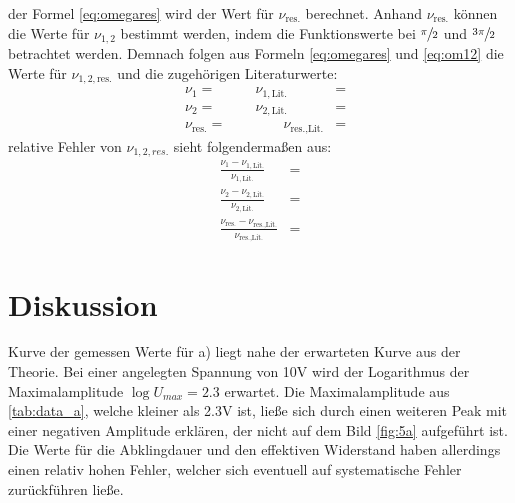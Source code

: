  \justifying der Formel \eqref{eq:omegares} wird der Wert für $\nu_{\text{res.}}$ berechnet. Anhand $\nu_{\text{res.}}$
  können die Werte für $\nu_{1,2}$ bestimmt werden, indem die Funktionswerte bei $\sfrac{\pi}{2}$ und 
  $\sfrac{3\pi}{2}$ betrachtet werden. Demnach folgen aus Formeln \eqref{eq:omegares} und \eqref{eq:om12} die Werte für $\nu_{1,2,\text{res.}}$ und die
  zugehörigen Literaturwerte:
  \begin{subequations}\label{eq:36}
  \begin{align}
    &\nu_1 = \text{} \qquad &\nu_{1,\text{Lit.}} &= \text{} \\
    &\nu_2 = \text{} \qquad &\nu_{2,\text{Lit.}} &= \text{} \\
    &\nu_{\text{res.}} = \text{} &\qquad \nu_{\text{res.,Lit.}} &= \text{}
  \end{align}
  \end{subequations}
  \justifying relative Fehler von $\nu_{1,2,res.}$ sieht folgendermaßen aus:
  \begin{subequations}\label{eq:37}
  \begin{align}
    \frac{\nu_1 - \nu_{1,\text{Lit.}}}{\nu_{1,\text{Lit.}}} &= \text{} \\
    \frac{\nu_2 - \nu_{2,\text{Lit.}}}{\nu_{2,\text{Lit.}}} &= \text{} \\
    \frac{\nu_{\text{res.}} - \nu_{\text{res.,Lit.}}}{\nu_{\text{res.,Lit.}}} &= \text{}
  \end{align} 
  \end{subequations}
  \newpage


\section{Diskussion}\justifying

\justifying Kurve der gemessen Werte für a) liegt nahe der erwarteten Kurve aus der Theorie. Bei einer angelegten 
Spannung von 10V wird der Logarithmus der Maximalamplitude $\log{U_{max}} = \num{2.3} $ erwartet. Die Maximalamplitude aus \ref{tab:data_a}, 
welche kleiner als 2.3V ist, ließe sich durch einen weiteren Peak mit einer negativen Amplitude erklären, der nicht auf dem Bild 
\ref{fig:5a} aufgeführt ist. Die Werte für die Abklingdauer und den effektiven Widerstand haben allerdings einen relativ hohen Fehler, 
welcher sich eventuell auf systematische Fehler zurückführen ließe. 

